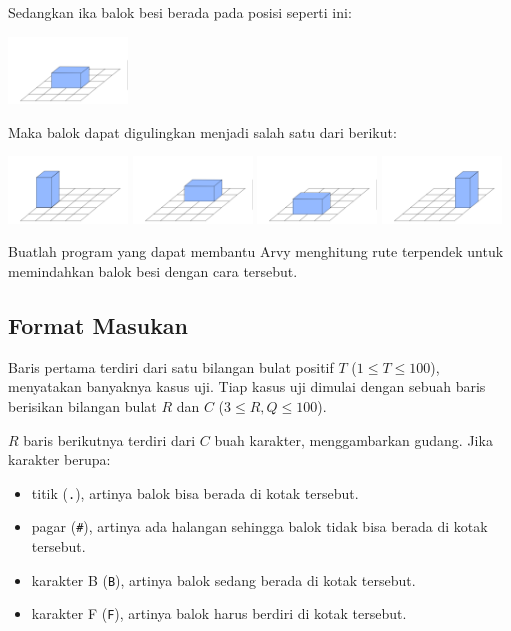 \documentclass{article}
\begin{document}
Sedangkan ika balok besi berada pada posisi seperti ini:

\begin{center}
    \includegraphics[width=120px]{balok-2-awal}
\end{center}

Maka balok dapat digulingkan menjadi salah satu dari berikut:

\includegraphics[width=120px]{balok-2-kiri}
\includegraphics[width=120px]{balok-2-belakang}
\includegraphics[width=120px]{balok-2-depan}
\includegraphics[width=120px]{balok-2-kanan}

Buatlah program yang dapat membantu Arvy menghitung rute terpendek untuk memindahkan balok besi dengan cara tersebut.

\pagebreak

\subsection*{Format Masukan}
Baris pertama terdiri dari satu bilangan bulat positif $T$ ($1 \leq T \leq 100$), menyatakan banyaknya kasus uji.
Tiap kasus uji dimulai dengan sebuah baris berisikan bilangan bulat $R$ dan $C$ ($3 \leq R, Q \leq 100$).

$R$ baris berikutnya terdiri dari $C$ buah karakter, menggambarkan gudang. Jika karakter berupa:
\begin{itemize}
    \setlength\itemsep{0pt}
    \item titik (\lstinline{.}), artinya balok bisa berada di kotak tersebut.
    \item pagar (\lstinline{#}), artinya ada halangan sehingga balok tidak bisa berada di kotak tersebut.
    \item karakter B (\lstinline{B}), artinya balok sedang berada di kotak tersebut.
    \item karakter F (\lstinline{F}), artinya balok harus berdiri di kotak tersebut.
\end{itemize}
\end{document}
